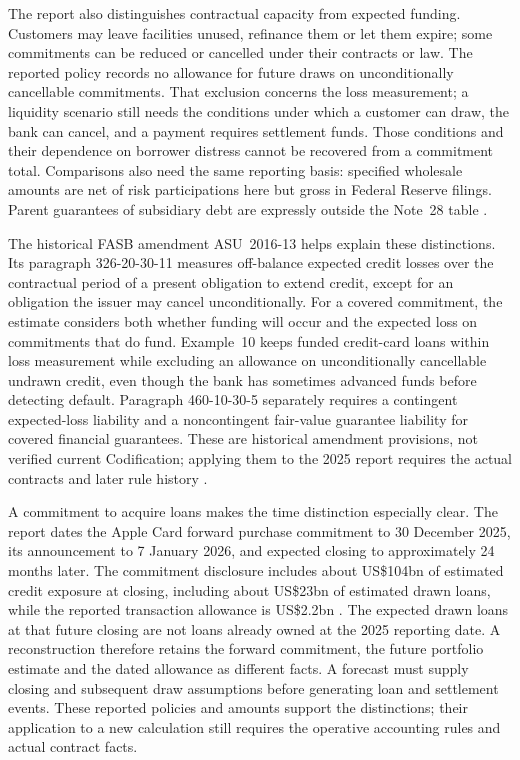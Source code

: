 The report also distinguishes contractual capacity from expected funding.
Customers may leave facilities unused, refinance them or let them expire;
some commitments can be reduced or cancelled under their contracts or law.
The reported policy records no allowance for future draws on unconditionally
cancellable commitments. That exclusion concerns the loss measurement;
a liquidity scenario still needs the conditions under which a customer can
draw, the bank can cancel, and a payment requires settlement funds. Those
conditions and their dependence on borrower distress cannot be recovered
from a commitment total. Comparisons also need the same reporting basis:
specified wholesale amounts are net of risk participations here but gross
in Federal Reserve filings. Parent guarantees of subsidiary debt are
expressly outside the Note~28 table
\citep[pp.~258, 295--296, 300]{jpmorgan2025tenk}.

The historical FASB amendment ASU~2016-13 helps explain these distinctions.
Its paragraph 326-20-30-11 measures off-balance expected credit losses over
the contractual period of a present obligation to extend credit, except for
an obligation the issuer may cancel unconditionally. For a covered commitment,
the estimate considers both whether funding will occur and the expected loss
on commitments that do fund. Example~10 keeps funded credit-card loans within
loss measurement while excluding an allowance on unconditionally cancellable
undrawn credit, even though the bank has sometimes advanced funds before
detecting default. Paragraph 460-10-30-5 separately requires a contingent
expected-loss liability and a noncontingent fair-value guarantee liability
for covered financial guarantees. These are historical amendment provisions,
not verified current Codification; applying them to the 2025 report requires
the actual contracts and later rule history
\citep[PDF pp.~2, 108, 118, 144, 173--176]{fasb2016asu}.

A commitment to acquire loans makes the time distinction especially clear.
The report dates the Apple Card forward purchase commitment to 30 December
2025, its announcement to 7 January 2026, and expected closing to
approximately 24 months later. The commitment disclosure includes about
US\$104bn of estimated credit exposure at closing, including about US\$23bn
of estimated drawn loans, while the reported transaction allowance is
US\$2.2bn \citep[pp.~47, 260, 296]{jpmorgan2025tenk}. The expected drawn
loans at that future closing are not loans already owned at the 2025 reporting
date. A reconstruction therefore retains the forward commitment, the future
portfolio estimate and the dated allowance as different facts. A forecast
must supply closing and subsequent draw assumptions before generating loan
and settlement events. These reported policies and amounts support the
distinctions; their application to a new calculation still requires the
operative accounting rules and actual contract facts.

